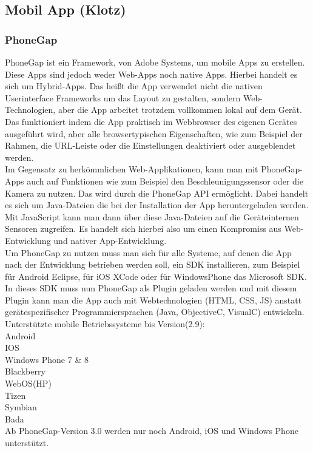 \subsection{Mobil App (Klotz)}

\subsubsection{PhoneGap}
PhoneGap ist ein Framework, von Adobe Systems, um mobile Apps zu erstellen. Diese Apps sind jedoch weder Web-Apps noch native Apps. Hierbei handelt es sich um Hybrid-Apps. Das heißt die App verwendet nicht die nativen Userinterface Frameworks um das Layout zu gestalten, sondern Web-Technologien, aber die App arbeitet trotzdem vollkommen lokal auf dem Gerät.\\
Das funktioniert indem die App praktisch im Webbrowser des eigenen Gerätes ausgeführt wird, aber alle browsertypischen Eigenschaften, wie zum Beispiel der Rahmen, die URL-Leiste oder die Einstellungen deaktiviert oder ausgeblendet werden.\\
Im Gegensatz zu herkömmlichen Web-Applikationen, kann man mit PhoneGap-Apps auch auf Funktionen wie zum Beispiel den Beschleunigungssensor oder die Kamera zu nutzen. Das wird durch die PhoneGap API ermöglicht. Dabei handelt es sich um Java-Dateien die bei der Installation der App heruntergeladen werden. Mit JavaScript kann man dann über diese Java-Dateien auf die Geräteinternen Sensoren zugreifen. Es handelt sich hierbei also um einen Kompromiss aus Web-Entwicklung und nativer App-Entwicklung.\\
Um PhoneGap zu nutzen muss man sich für alle Systeme, auf denen die App nach der Entwicklung betrieben werden soll, ein SDK installieren, zum Beispiel für Android Eclipse, für iOS XCode oder für WindowsPhone das Microsoft SDK. In dieses SDK muss nun PhoneGap als Plugin geladen werden und mit diesem Plugin kann man die App auch mit Webtechnologien (HTML, CSS, JS) anstatt gerätespezifischer Programmiersprachen (Java, ObjectiveC, VisualC) entwickeln.\\
Unterstützte mobile Betriebssysteme bis Version(2.9):\\
					Android\\
					IOS\\
					Windows Phone 7 \& 8\\
					Blackberry\\
					WebOS(HP)\\
					Tizen\\
					Symbian\\
					Bada\\
Ab PhoneGap-Version 3.0 werden nur noch Android, iOS und Windows Phone unterstützt.\\

